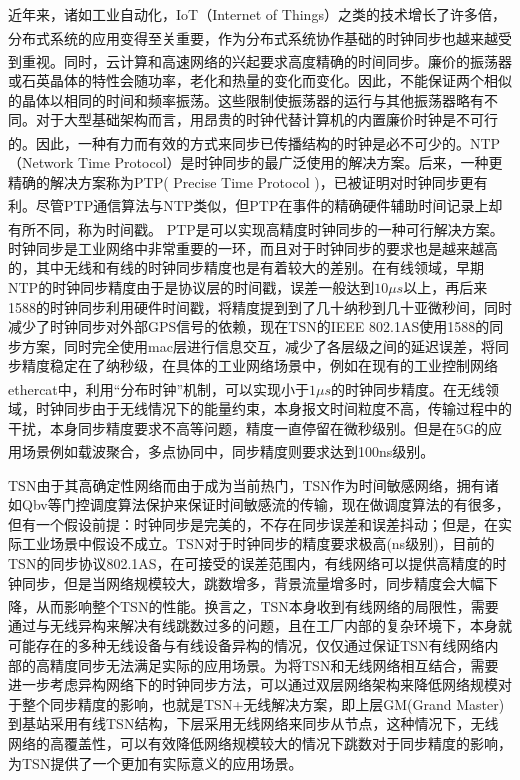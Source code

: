 \documentclass[UTF8,a4paper,12pt]{ctexart}
\numberwithin{equation}{section}
\begin{document}
近年来，诸如工业自动化，IoT（Internet of Things）之类的技术增长了许多倍，分布式系统的应用变得至关重要\textsuperscript{\cite{7879243}}，作为分布式系统协作基础的时钟同步也越来越受到重视。同时，云计算和高速网络的兴起要求高度精确的时间同步\textsuperscript{\cite{CHEN20143}}。廉价的振荡器或石英晶体的特性会随功率，老化和热量的变化而变化。因此，不能保证两个相似的晶体以相同的时间和频率振荡。这些限制使振荡器的运行与其他振荡器略有不同。对于大型基础架构而言，用昂贵的时钟代替计算机的内置廉价时钟是不可行的。因此，一种有力而有效的方式来同步已传播结构的时钟是必不可少的\textsuperscript{\cite{8278257}}。NTP（Network Time Protocol）是时钟同步的最广泛使用的解决方案。后来，一种更精确的解决方案称为PTP( Precise Time Protocol )，已被证明对时钟同步更有利\textsuperscript{\cite{5223605}}。尽管PTP通信算法与NTP类似，但PTP在事件的精确硬件辅助时间记录上却有所不同，称为时间戳\textsuperscript{\cite{ahmed2018survey}}。 PTP是可以实现高精度时钟同步的一种可行解决方案。时钟同步是工业网络中非常重要的一环，而且对于时钟同步的要求也是越来越高的，其中无线和有线的时钟同步精度也是有着较大的差别。在有线领域，早期NTP的时钟同步精度由于是协议层的时间戳，误差一般达到$10\mu s$以上，再后来1588的时钟同步利用硬件时间戳，将精度提到到了几十纳秒到几十亚微秒间，同时减少了时钟同步对外部GPS信号的依赖，现在TSN的IEEE 802.1AS使用1588的同步方案，同时完全使用mac层进行信息交互，减少了各层级之间的延迟误差，将同步精度稳定在了纳秒级，在具体的工业网络场景中，例如在现有的工业控制网络ethercat中，利用“分布时钟”机制，可以实现小于$1 \mu s$的时钟同步精度\textsuperscript{\cite{idrees2020ieee}}。在无线领域，时钟同步由于无线情况下的能量约束，本身报文时间粒度不高，传输过程中的干扰，本身同步精度要求不高等问题，精度一直停留在微秒级别。但是在5G的应用场景例如载波聚合，多点协同中，同步精度则要求达到100ns级别\textsuperscript{\cite{jakovetic2014fast}}。


TSN由于其高确定性网络而由于成为当前热门，TSN作为时间敏感网络，拥有诸如Qbv等门控调度算法保护来保证时间敏感流的传输，现在做调度算法的有很多，但有一个假设前提：时钟同步是完美的，不存在同步误差和误差抖动；但是，在实际工业场景中假设不成立。TSN对于时钟同步的精度要求极高(ns级别)，目前的TSN的同步协议802.1AS，在可接受的误差范围内，有线网络可以提供高精度的时钟同步，但是当网络规模较大，跳数增多，背景流量增多时，同步精度会大幅下降，从而影响整个TSN的性能\textsuperscript{\cite{ieee2011ieee}}。换言之，TSN本身收到有线网络的局限性，需要通过与无线异构来解决有线跳数过多的问题，且在工厂内部的复杂环境下，本身就可能存在的多种无线设备与有线设备异构的情况，仅仅通过保证TSN有线网络内部的高精度同步无法满足实际的应用场景。为将TSN和无线网络相互结合，需要进一步考虑异构网络下的时钟同步方法，可以通过双层网络架构来降低网络规模对于整个同步精度的影响，也就是TSN+无线解决方案，即上层GM(Grand Master)到基站采用有线TSN结构，下层采用无线网络来同步从节点，这种情况下，无线网络的高覆盖性，可以有效降低网络规模较大的情况下跳数对于同步精度的影响，为TSN提供了一个更加有实际意义的应用场景。
\end{document}

